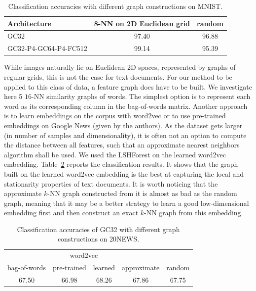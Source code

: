 \documentclass{article}
\newcommand{\tabref}[1]{Table~\ref{tab:#1}}
\newcommand{\todo}[1]{{\color{red} #1 }}
\begin{document}



\begin{table}[h!]
\centering
\begin{tabular}{lcc} \toprule
Architecture & 8-NN on 2D Euclidean grid & random \\
\midrule
GC32 & 97.40 & 96.88 \\
GC32-P4-GC64-P4-FC512 & 99.14 & 95.39 \\
\bottomrule \end{tabular}
\caption{Classification accuracies with different graph constructions on MNIST.} 
\label{tab:mnist_quality}
\end{table}



While images naturally lie on Euclidean 2D spaces, represented by graphs of regular grids, this is not the case for
text documents. For our method to be applied to this class of data, a feature graph does have to be built.
We investigate here 5 $16$-NN similarity graphs of words. The simplest option is
to represent each word as its corresponding column in the bag-of-words matrix.
Another approach is to learn embeddings on the corpus with word2vec
\cite{pro:MikolovChenCorradoDean13word2vec} or to use pre-trained embeddings on
Google News (given by the authors). As the dataset gets larger (in number of
samples and dimensionality), it is often not an option to compute the distance
between all features, such that an approximate nearest neighbors algorithm shall
be used. We used the LSHForest \cite{pro:BawaCondieGanesan05LSHForest} on the
learned word2vec embedding. \tabref{20news_quality} reports the classification
results. It shows that the graph built on the learned word2vec embedding is the
best at capturing the local and stationarity properties of text documents. It is
worth noticing that the approximate $k$-NN graph constructed from it is almost
as bad as the random graph, meaning that it may be a better strategy to learn a
good low-dimensional embedding first and then construct an exact $k$-NN graph
from this embedding.

\begin{table}[h!] \centering
\begin{tabular}{ccccc} \toprule
& \multicolumn{2}{c}{word2vec} & & \\
bag-of-words & pre-trained & learned & approximate & random \\
\midrule
67.50 & 66.98 & 68.26 & 67.86 & 67.75 \\
\bottomrule \end{tabular}
\caption{Classification accuracies of GC32 with different graph constructions on 20NEWS.} 
\label{tab4b}
\label{tab:20news_quality}
\end{table}
\end{document}
